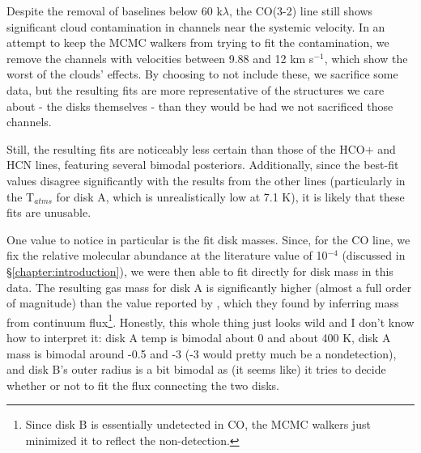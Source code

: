 Despite the removal of baselines below 60 k$\lambda$, the CO(3-2) line still shows significant cloud contamination in channels near the systemic velocity. In an attempt to keep the MCMC walkers from trying to fit the contamination, we remove the channels with velocities between 9.88 and 12 km s$^{-1}$, which show the worst of the clouds' effects. By choosing to not include these, we sacrifice some data, but the resulting fits are more representative of the structures we care about - the disks themselves - than they would be had we not sacrificed those channels.

Still, the resulting fits are noticeably less certain than those of the HCO+ and HCN lines, featuring several bimodal posteriors. Additionally, since the best-fit values disagree significantly with the results from the other lines (particularly in the T$_{atms}$ for disk A, which is unrealistically low at 7.1 K), it is likely that these fits are unusable.

One value to notice in particular is the fit disk masses. Since, for the CO line, we fix the relative molecular abundance at the literature value of 10$^{-4}$ (discussed in \S\ref{chapter:introduction}), we were then able to fit directly for disk mass in this data. The resulting gas mass for disk A is significantly higher (almost a full order of magnitude) than the value reported by \cite{Williams2014}, which they found by inferring mass from continuum flux\footnote{Since disk B is essentially undetected in CO, the MCMC walkers just minimized it to reflect the non-detection.}. Honestly, this whole thing just looks wild and I don't know how to interpret it: disk A temp is bimodal about 0 and about 400 K, disk A mass is bimodal around -0.5 and -3 (-3 would pretty much be a nondetection), and disk B's outer radius is a bit bimodal as (it seems like) it tries to decide whether or not to fit the flux connecting the two disks.


